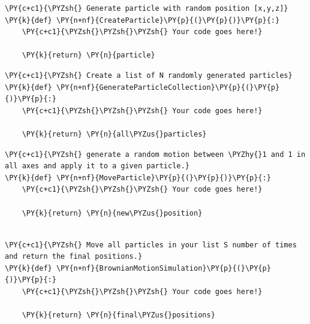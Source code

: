     \begin{tcolorbox}[breakable, size=fbox, boxrule=1pt, pad at break*=1mm,colback=cellbackground, colframe=cellborder]
\begin{Verbatim}[commandchars=\\\{\}]
\PY{c+c1}{\PYZsh{} Generate particle with random position [x,y,z]}
\PY{k}{def} \PY{n+nf}{CreateParticle}\PY{p}{(}\PY{p}{)}\PY{p}{:}
    \PY{c+c1}{\PYZsh{}\PYZsh{}\PYZsh{} Your code goes here!}

    \PY{k}{return} \PY{n}{particle}
\end{Verbatim}
\end{tcolorbox}

    \begin{tcolorbox}[breakable, size=fbox, boxrule=1pt, pad at break*=1mm,colback=cellbackground, colframe=cellborder]
\begin{Verbatim}[commandchars=\\\{\}]
\PY{c+c1}{\PYZsh{} Create a list of N randomly generated particles}
\PY{k}{def} \PY{n+nf}{GenerateParticleCollection}\PY{p}{(}\PY{p}{)}\PY{p}{:}
    \PY{c+c1}{\PYZsh{}\PYZsh{}\PYZsh{} Your code goes here!}
    
    \PY{k}{return} \PY{n}{all\PYZus{}particles}
\end{Verbatim}
\end{tcolorbox}

    \begin{tcolorbox}[breakable, size=fbox, boxrule=1pt, pad at break*=1mm,colback=cellbackground, colframe=cellborder]
\begin{Verbatim}[commandchars=\\\{\}]
\PY{c+c1}{\PYZsh{} generate a random motion between \PYZhy{}1 and 1 in all axes and apply it to a given particle.}
\PY{k}{def} \PY{n+nf}{MoveParticle}\PY{p}{(}\PY{p}{)}\PY{p}{:}
    \PY{c+c1}{\PYZsh{}\PYZsh{}\PYZsh{} Your code goes here!}

    \PY{k}{return} \PY{n}{new\PYZus{}position}
    
\end{Verbatim}
\end{tcolorbox}

    \begin{tcolorbox}[breakable, size=fbox, boxrule=1pt, pad at break*=1mm,colback=cellbackground, colframe=cellborder]
\begin{Verbatim}[commandchars=\\\{\}]
\PY{c+c1}{\PYZsh{} Move all particles in your list S number of times and return the final positions.}
\PY{k}{def} \PY{n+nf}{BrownianMotionSimulation}\PY{p}{(}\PY{p}{)}\PY{p}{:}
    \PY{c+c1}{\PYZsh{}\PYZsh{}\PYZsh{} Your code goes here!}
    
    \PY{k}{return} \PY{n}{final\PYZus{}positions}
\end{Verbatim}
\end{tcolorbox}

